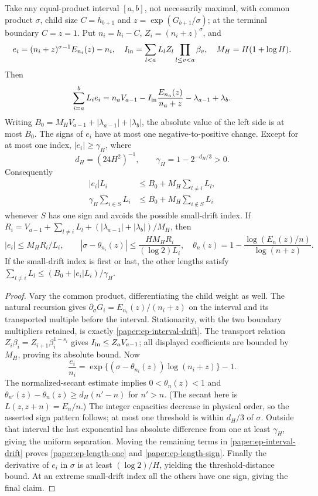 \begin{lemma}\label{paper:ep-single-crossing}
Take any equal-product interval $[a,b]$, not necessarily maximal, with
common product $\sigma$, child size $C=h_{b+1}$ and
$z=\exp(G_{b+1}/\sigma)$; at the terminal boundary $C=z=1$.
Put $n_i=h_i-C$, $Z_i=(n_i+z)^\sigma$, and
\[
 e_i=(n_i+z)^{\sigma-1}E_{n_i}(z)-n_i,\quad
 I_{\rm in}=\sum_{l<a}L_lZ_l\prod_{l\leq v<a}\beta_v,
 \quad M_H=H(1+\log H).
\]
Then
\begin{equation}\label{paper:ep-interval-drift}
 \sum_{i=a}^bL_ie_i
 =n_aV_{a-1}-I_{\rm in}\frac{E_{n_a}(z)}{n_a+z}
       -\lambda_{a-1}+\lambda_b.
\end{equation}
Writing $B_0=M_HV_{a-1}+|\lambda_{a-1}|+|\lambda_b|$,
the absolute value of the left side is at most $B_0$.
The signs of $e_i$ have at most one negative-to-positive change.
Except for at most one index, $|e_i|\geq\gamma_H$, where
\[
 d_H=(24H^2)^{-1},\qquad \gamma_H=1-2^{-d_H/3}>0.
\]
Consequently
\begin{align}
 |e_i|L_i&\leq B_0+M_H\sum_{l\ne i}L_l,\label{paper:ep-length-one}\\
 \gamma_H\sum_{i\in S}L_i
 &\leq B_0+M_H\sum_{i\notin S}L_i\label{paper:ep-length-sign}
\end{align}
whenever $S$ has one sign and avoids the possible small-drift index.
If $R_i=V_{a-1}+\sum_{l\ne i}L_l+
(|\lambda_{a-1}|+|\lambda_b|)/M_H$, then
\[
 |e_i|\leq M_HR_i/L_i,\qquad
 |\sigma-\theta_{n_i}(z)|\leq\frac{HM_HR_i}{(\log2)L_i},
 \quad
 \theta_n(z)=1-\frac{\log(E_n(z)/n)}{\log(n+z)}.
\]
If the small-drift index is first or last, the other lengths satisfy
$\sum_{l\ne i}L_l\leq(B_0+|e_i|L_i)/\gamma_H$.
\end{lemma}
\begin{proof}
Vary the common product, differentiating the child weight as well.
The natural recursion gives $\partial_\sigma G_i=E_{n_i}(z)/(n_i+z)$
on the interval and its transported multiple before the interval.
Stationarity, with the two boundary multipliers retained, is exactly
\eqref{paper:ep-interval-drift}.  The transport relation
$Z_i\beta_i=Z_{i+1}\beta_i^{1-s_i}$ gives
$I_{\rm in}\leq Z_aV_{a-1}$; all displayed coefficients are bounded
by $M_H$, proving its absolute bound.
Now
\[
 \frac{e_i}{n_i}
 =\exp\{(\sigma-\theta_{n_i}(z))\log(n_i+z)\}-1.
\]
The normalized-secant estimate implies
$0<\theta_n(z)<1$ and
$\theta_{n'}(z)-\theta_n(z)\geq d_H(n'-n)$ for $n'>n$.
(The secant here is $L(z,z+n)=E_n/n$.)  The integer capacities decrease
in physical order, so the asserted sign pattern follows; at most one
threshold is within $d_H/3$ of $\sigma$.  Outside that interval the
last exponential has absolute difference from one at least
$\gamma_H$, giving the uniform separation.  Moving the remaining
terms in \eqref{paper:ep-interval-drift} proves
\eqref{paper:ep-length-one} and \eqref{paper:ep-length-sign}.
Finally the derivative of $e_i$ in $\sigma$ is at least
$(\log2)/H$, yielding the threshold-distance bound.  At an extreme
small-drift index all the others have one sign, giving the final claim.
\end{proof}
